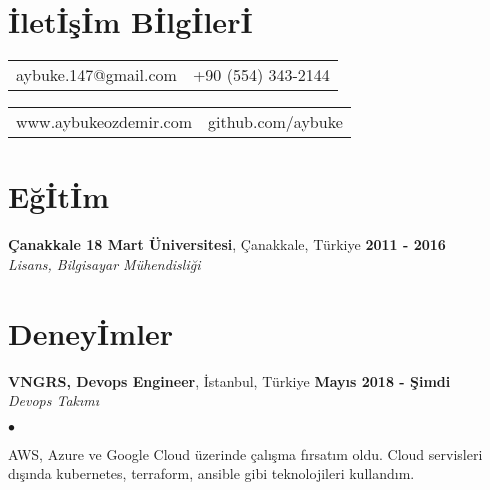\documentclass[margin,line]{res}
\newenvironment{list2}{
  \begin{list}{$\bullet$}{%
      \setlength{\itemsep}{0in}
      \setlength{\parsep}{0in} \setlength{\parskip}{0in}
      \setlength{\topsep}{0in} \setlength{\partopsep}{0in}
      \setlength{\leftmargin}{0.1in}}}{\end{list}}
\begin{document}
\small
{}

\begin{resume}
\section{\sc \.{I}let\.{I}\c{s}\.{I}m B\.{I}lg\.{I}ler\.{I}}
\begin{tabular}{@{}p{2in}p{3.8in}}
aybuke.147@gmail.com & {\hfill{\it}  +90 (554) 343-2144} \\
\end{tabular}
\begin{tabular}{@{}p{2in}p{3.8in}}
www.aybukeozdemir.com & {\hfill{\it}  github.com/aybuke} \\
\end{tabular}

\vspace*{-.3cm}
\section{\sc E\u{g}\.{I}t\.{I}m}

{\bf \c{C}anakkale 18 Mart \"{U}niversitesi}, \c{C}anakkale, T\"{u}rkiye  \hfill {\bf 2011 - 2016} \\

\vspace*{-.7cm}
{\em Lisans, Bilgisayar M\"{u}hendisli\u{g}i} \hfill {\ } \\
\vspace*{-.09in}
\vspace*{-.3cm}


\vspace*{-.3cm}
\section{\sc Deney\.{I}mler}

{\bf VNGRS, Devops Engineer}, \.{I}stanbul, T\"{u}rkiye \hfill {\bf May{\i}s 2018 - \c{S}imdi}\\

\vspace{-.7cm}
{\em Devops Tak{\i}m{\i} }
\vspace*{+.05in}
\begin{list2}
\item AWS, Azure ve Google Cloud \"{u}zerinde \c{c}al{\i}\c{s}ma f{\i}rsat{\i}m oldu. Cloud servisleri d{\i}\c{s}{\i}nda kubernetes, terraform, ansible gibi teknolojileri kulland{\i}m.
\end{list2}


\end{resume}
\end{document}
